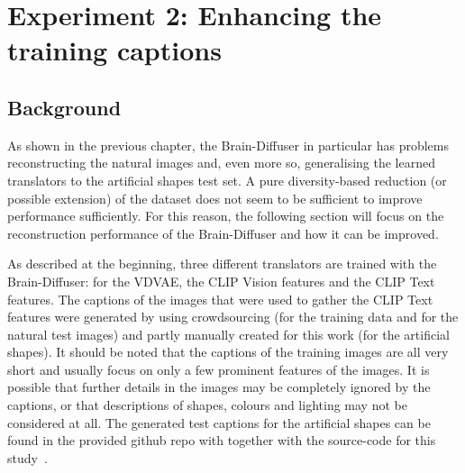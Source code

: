 \section{Experiment 2: Enhancing the training captions}

\subsection{Background}

As shown in the previous chapter, the Brain-Diffuser in particular has problems reconstructing the natural images and, even more so, generalising the learned translators to the artificial shapes test set. A pure diversity-based reduction (or possible extension) of the dataset does not seem to be sufficient to improve performance sufficiently. For this reason, the following section will focus on the reconstruction performance of the Brain-Diffuser and how it can be improved. 

As described at the beginning, three different translators are trained with the Brain-Diffuser: for the VDVAE, the CLIP Vision features and the CLIP Text features. The captions of the images that were used to gather the CLIP Text features were generated by using crowdsourcing (for the training data and for the natural test images) and partly manually created for this work (for the artificial shapes). It should be noted that the captions of the training images are all very short and usually focus on only a few prominent features of the images. It is possible that further details in the images may be completely ignored by the captions, or that descriptions of shapes, colours and lighting may not be considered at all. The generated test captions for the artificial shapes can be found in the provided github repo with together with the source-code for this study~\cite{mildenbergerKamitaniLabBrain_diffuser}.

